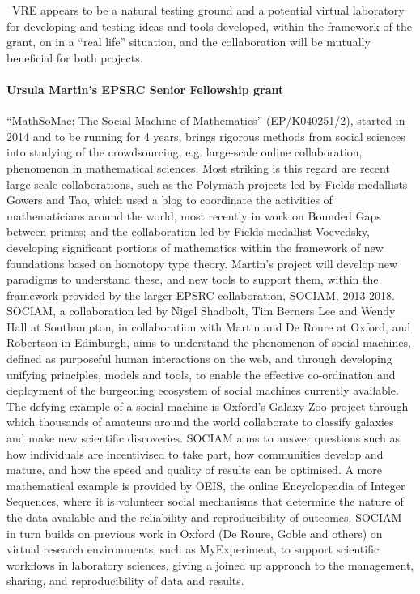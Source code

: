 \TheProject\ VRE appears to be a natural testing ground and a potential virtual
laboratory for developing and testing ideas and tools developed, within the
framework of the grant, on in a ``real life'' situation, and the collaboration
will be mutually beneficial for both projects.

 
\paragraph{Ursula Martin's EPSRC Senior Fellowship grant}
``MathSoMac: The Social Machine of Mathematics'' (EP/K040251/2), started in 2014 and to be running 
for 4 years, brings rigorous methods from social
sciences into studying of the crowdsourcing, e.g. large-scale online
collaboration, phenomenon in mathematical sciences. 
 Most striking is this regard are recent large scale collaborations, such
as the Polymath projects led by Fields medallists Gowers and Tao, which used a blog to coordinate the
activities of mathematicians around the world, most recently in work on Bounded Gaps between primes; and
the collaboration led by Fields medallist Voevedsky, developing significant portions of mathematics
within the framework of new foundations based on homotopy type theory. Martin’s project will develop new
paradigms to understand these, and new tools to support them, within the framework provided by the
larger EPSRC collaboration, SOCIAM, 2013-2018. SOCIAM, a collaboration led by Nigel Shadbolt, Tim
Berners Lee and Wendy Hall at Southampton, in collaboration with Martin and De Roure at Oxford, and
Robertson in Edinburgh, aims to understand the phenomenon of social machines, defined as purposeful
human interactions on the web, and through developing unifying principles, models and tools, to enable
the effective co-ordination and deployment of the burgeoning ecosystem of social machines currently
available. The defying example of a social machine is Oxford’s Galaxy Zoo project through which
thousands of amateurs around the world collaborate to classify galaxies and make new scientific
discoveries. SOCIAM aims to answer questions such as how individuals are incentivised to take part, how
communities develop and mature, and how the speed and quality of results can be optimised. A more
mathematical example is provided by OEIS, the online Encyclopeadia of Integer Sequences, where it is
volunteer social mechanisms that determine the nature of the data available and the reliability and
reproducibility of outcomes. SOCIAM in turn builds on previous work in Oxford (De Roure, Goble and
others) on virtual research environments, such as MyExperiment, to support scientific workflows in
laboratory sciences,  giving a joined up approach to the management, sharing, and reproducibility of
data and results.

